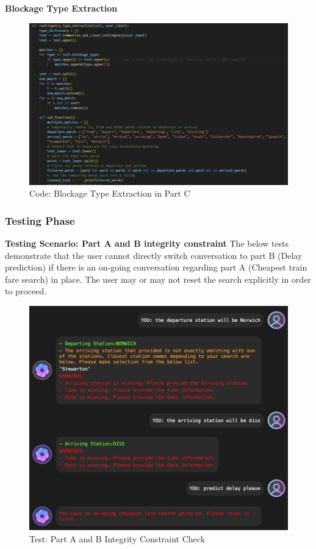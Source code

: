\textbf{Blockage Type Extraction}
\begin{figure} [!htbp]
    \centering
    \includegraphics[width=1\linewidth]{Diagrams/Group_work/part_c.png}
    \caption{Code: Blockage Type Extraction in Part C}
    \label{fig:part_c_blockage}
\end{figure}

\clearpage
\subsubsection{Testing Phase}
\textbf{Testing Scenario: Part A and B integrity constraint}
The below tests demonstrate that the user cannot directly switch conversation to part B (Delay prediction) if there is an on-going conversation regarding part A (Cheapest train fare search) in place. The user may or may not reset the search explicitly in order to proceed.
\begin{figure} [!htbp]
    \centering
    \includegraphics[width=1\linewidth]{Diagrams/Group_work/testing_1.png}
    \caption{Test: Part A and B Integrity Constraint Check}
    \label{fig:test_1}
\end{figure}

